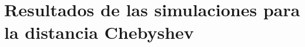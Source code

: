 \documentclass[conference]{IEEEtran}
\begin{document}


\section{Resultados de las simulaciones para la distancia Chebyshev}
\end{document}
